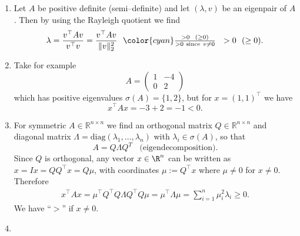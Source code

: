 {
\color{solution}
\begin{enumerate}
	\item %
	Let $A$ be positive definite (semi--definite) and let $(\lambda, v)$ be an eigenpair of $A$. Then by using the Rayleigh quotient we find
	$$\lambda = \frac{v^\top A v}{v^\top v} = \frac{v^\top A v}{\|v\|_2^2}~~{\color{cyan}\tfrac{> 0~~ (\geq 0)}{> 0 ~ \text{since}~v\neq 0  }} ~~> 0~~ (\geq 0). $$
%	
	\item Take for example 
	$$A=\begin{pmatrix}
	1&-4\\
	0&2
	\end{pmatrix} $$
	which has positive eigenvalues $\sigma(A)=\{1,2\}$, but for $x=(1,1)^\top$ we have
		$$x^\top A x = -3+2 = -1 < 0. $$
	\item 	For symmetric $A\in\mathbb{R}^{n\times n}$ we find an orthogonal matrix $Q\in\mathbb{R}^{n\times n}$ and diagonal matrix $\Lambda = \text{diag}(\lambda_1,\ldots,\lambda_n)$ with $\lambda_i\in\sigma(A)$, so that   $$A=Q\Lambda Q^T ~~~~\text{(eigendecomposition)}.$$
	Since $Q$ is orthogonal, any vector $x \in \R^n$ can be written as $x = Ix=QQ^\top x=Q\mu$, with coordinates $\mu := Q^\top x$ where $\mu \neq 0$ for $x\neq 0$. Therefore 
	\begin{equation*}
	\begin{aligned}
	x^\top A x = \mu^\top Q^\top Q\Lambda Q^\top Q \mu = \mu^\top \Lambda \mu = \sum_{i=1}^n \mu_i^2 \lambda_i \geq 0.
	\end{aligned}
	\end{equation*}
	We have ``$>$'' if $x \neq 0$.
	\item 

\end{enumerate}}
